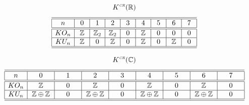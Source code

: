 \documentclass[12pt, reqno]{amsart}
\theoremstyle{definition}
\def\R{{\mathbb R}}
\def\C{{\mathbb C}}
\def\Z{{\mathbb Z}}
\def\crr{^{\scriptscriptstyle {\it CR}}}
\newcommand{\sm}[4]
	{ \left( \begin{smallmatrix} {#1} & {#2} \\ {#3} & {#4} \end{smallmatrix} \right)  }
\newcommand{\smv}[2]
	{ \left( \begin{smallmatrix} {#1}  \\ {#2} \end{smallmatrix} \right)  }
\newcommand{\smh}[2]
	{ \left( \begin{smallmatrix} {#1} & {#2}  \end{smallmatrix} \right)  }
\begin{document}
\begin{table}[h]  \label{crrRCT}
\caption{The free $\mathcal{CR}$-modules}
$$K\crr(\R)$$
\[ \begin{array}{|c|c|c|c|c|c|c|c|c|c|}  
\hline \hline  
n & ~0~ & ~1~ & ~2~ & ~3~ & ~4~ & ~5~ & ~6~ & ~7~  \\
\hline  \hline
KO_n
& \Z  & \Z_2  & \Z_2  & 0 
	& \Z  & 0 & 0 & 0  \\
\hline  
KU_n 
& \Z  & 0 & \Z  & 0 & \Z   & 0 
	& \Z  & 0   \\
\hline \hline
\end{array} \]

\vspace{1cm}

$$K\crr(\C)$$
\[ \begin{array}{|c|c|c|c|c|c|c|c|c|c|}  
\hline  \hline 
n & \makebox[1cm][c]{0} & \makebox[1cm][c]{1} & 
\makebox[1cm][c]{2} & \makebox[1cm][c]{3} 
& \makebox[1cm][c]{4} & \makebox[1cm][c]{5} 
& \makebox[1cm][c]{6} & \makebox[1cm][c]{7}  \\
\hline  \hline
KO_n 
& \Z & 0 & \Z & 0 & \Z & 0 & \Z & 0   \\
\hline  
KU_n 
& \Z \oplus \Z & 0 & \Z \oplus \Z & 0 & \Z \oplus \Z & 0 
	& \Z \oplus \Z  & 0   \\
\hline \hline
\end{array} \]

\vspace{1cm}


\end{table}
\end{document}
